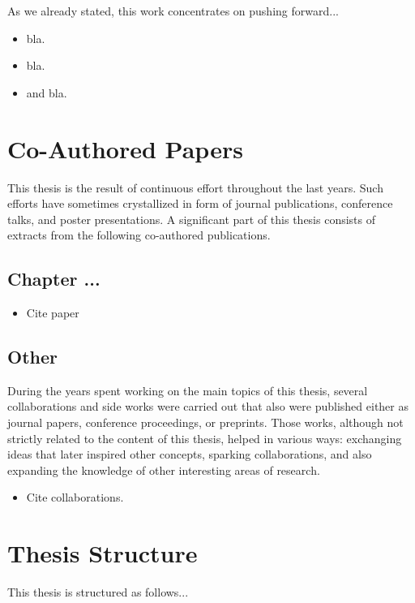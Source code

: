 As we already stated, this work concentrates on pushing forward... 

\begin{itemize}
    \item bla.
    \item bla.
    \item and bla.
\end{itemize}

\section{Co-Authored Papers}
\label{cha:introduction:sec:papers}

This thesis is the result of continuous effort throughout the last years. Such efforts have sometimes crystallized in form of journal publications, conference talks, and poster presentations. A significant part of this thesis consists of extracts from the following co-authored publications.

\subsection{Chapter ...}

\begin{itemize}
  \item Cite paper %
\end{itemize}


\subsection{Other}

During the years spent working on the main topics of this thesis, several collaborations and side works were carried out that also were published either as journal papers, conference proceedings, or preprints. Those works, although not strictly related to the content of this thesis, helped in various ways: exchanging ideas that later inspired other concepts, sparking collaborations, and also expanding the knowledge of other interesting areas of research.

\begin{itemize}
  \item Cite collaborations.
\end{itemize}

\section{Thesis Structure}
\label{cha:introduction:sec:structure}

This thesis is structured as follows... 